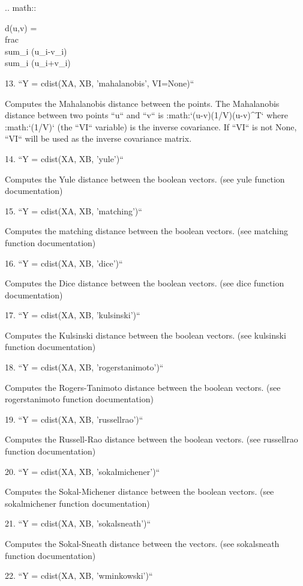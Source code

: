 \begin{DoxyVerb}
   .. math::

        d(u,v) = \\frac{\\sum_i (u_i-v_i)}
                      {\\sum_i (u_i+v_i)}

13. ``Y = cdist(XA, XB, 'mahalanobis', VI=None)``

   Computes the Mahalanobis distance between the points. The
   Mahalanobis distance between two points ``u`` and ``v`` is
   :math:`(u-v)(1/V)(u-v)^T` where :math:`(1/V)` (the ``VI``
   variable) is the inverse covariance. If ``VI`` is not None,
   ``VI`` will be used as the inverse covariance matrix.

14. ``Y = cdist(XA, XB, 'yule')``

   Computes the Yule distance between the boolean
   vectors. (see yule function documentation)

15. ``Y = cdist(XA, XB, 'matching')``

   Computes the matching distance between the boolean
   vectors. (see matching function documentation)

16. ``Y = cdist(XA, XB, 'dice')``

   Computes the Dice distance between the boolean vectors. (see
   dice function documentation)

17. ``Y = cdist(XA, XB, 'kulsinski')``

   Computes the Kulsinski distance between the boolean
   vectors. (see kulsinski function documentation)

18. ``Y = cdist(XA, XB, 'rogerstanimoto')``

   Computes the Rogers-Tanimoto distance between the boolean
   vectors. (see rogerstanimoto function documentation)

19. ``Y = cdist(XA, XB, 'russellrao')``

   Computes the Russell-Rao distance between the boolean
   vectors. (see russellrao function documentation)

20. ``Y = cdist(XA, XB, 'sokalmichener')``

   Computes the Sokal-Michener distance between the boolean
   vectors. (see sokalmichener function documentation)

21. ``Y = cdist(XA, XB, 'sokalsneath')``

   Computes the Sokal-Sneath distance between the vectors. (see
   sokalsneath function documentation)


22. ``Y = cdist(XA, XB, 'wminkowski')``


\end{DoxyVerb}
